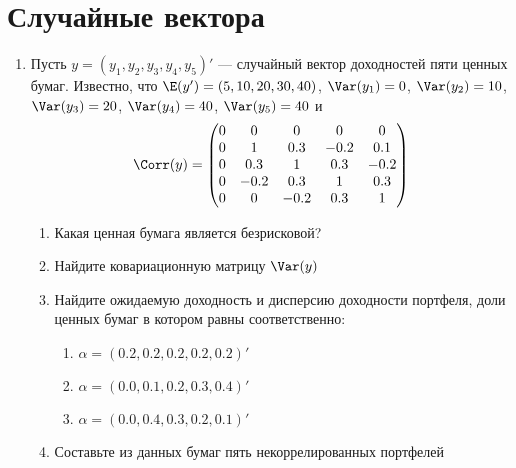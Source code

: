 \section{Случайные вектора}

\begin{enumerate}
\item Пусть $y=(y_1, y_2, y_3, y_4, y_5)'$ --- случайный вектор доходностей пяти ценных бумаг. Известно, что $\E(y')=(5, 10, 20, 30, 40)$, $\Var(y_1)=0$, $\Var(y_2)=10$, $\Var(y_3)=20$, $\Var(y_4)=40$, $\Var(y_5)=40$ и
\[
\Corr(y)=\begin{pmatrix}
0 & 0 & 0 & 0 & 0 \\
0 & 1 & 0.3 & -0.2 & 0.1 \\
0 & 0.3 & 1 & 0.3 & -0.2 \\
0 & -0.2 & 0.3& 1 & 0.3 \\
0 & 0 & -0.2 & 0.3 & 1 
\end{pmatrix}
\]
\begin{enumerate}
\item Какая ценная бумага является безрисковой?
\item Найдите ковариационную матрицу $\Var(y)$
\item Найдите ожидаемую доходность и дисперсию доходности портфеля, доли ценных бумаг в котором равны соответственно:
\begin{enumerate}
\item $\alpha=(0.2, 0.2, 0.2, 0.2, 0.2)'$
\item $\alpha=(0.0, 0.1, 0.2, 0.3, 0.4)'$
\item $\alpha=(0.0, 0.4, 0.3, 0.2, 0.1)'$
\end{enumerate}
\item Составьте из данных бумаг пять некоррелированных портфелей 
\end{enumerate}

\end{enumerate}